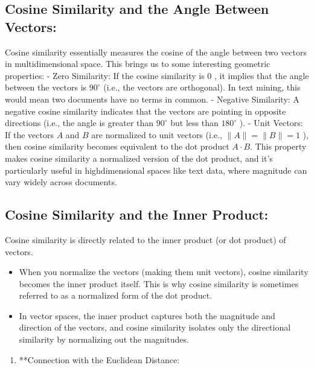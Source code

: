 \documentclass[
  12 pt,
  a4paper,
]{book}
\providecommand{\tightlist}{%
  \setlength{\itemsep}{0pt}\setlength{\parskip}{0pt}}
\numberwithin{equation}{section}
\theoremstyle{plain}      %
\theoremstyle{definition} %
\theoremstyle{remark}     %
\theoremstyle{note}         %
\begin{document}
\hypertarget{cosine-similarity-and-the-angle-between-vectors}{%
\subsection{Cosine Similarity and the Angle Between
Vectors:}\label{cosine-similarity-and-the-angle-between-vectors}}

Cosine similarity essentially measures the cosine of the angle between
two vectors in multidimensional space. This brings us to some
interesting geometric properties: - Zero Similarity: If the cosine
similarity is 0 , it implies that the angle between the vectors is
\(90^{\circ}\) (i.e., the vectors are orthogonal). In text mining, this
would mean two documents have no terms in common. - Negative Similarity:
A negative cosine similarity indicates that the vectors are pointing in
opposite directions (i.e., the angle is greater than \(90^{\circ}\) but
less than \(180^{\circ}\) ). - Unit Vectors: If the vectors \(A\) and
\(B\) are normalized to unit vectors (i.e., \(\|A\|=\|B\|=1\) ), then
cosine similarity becomes equivalent to the dot product \(A \cdot B\).
This property makes cosine similarity a normalized version of the dot
product, and it's particularly useful in highdimensional spaces like
text data, where magnitude can vary widely across documents.

\hypertarget{cosine-similarity-and-the-inner-product}{%
\subsection{Cosine Similarity and the Inner
Product:}\label{cosine-similarity-and-the-inner-product}}

Cosine similarity is directly related to the inner product (or dot
product) of vectors.

\begin{itemize}
\tightlist
\item
  When you normalize the vectors (making them unit vectors), cosine
  similarity becomes the inner product itself. This is why cosine
  similarity is sometimes referred to as a normalized form of the dot
  product.
\item
  In vector spaces, the inner product captures both the magnitude and
  direction of the vectors, and cosine similarity isolates only the
  directional similarity by normalizing out the magnitudes.
\end{itemize}

\begin{enumerate}
\def\labelenumi{\arabic{enumi}.}
\setcounter{enumi}{2}
\tightlist
\item
  **Connection with the Euclidean Distance:
\end{enumerate}
\end{document}

